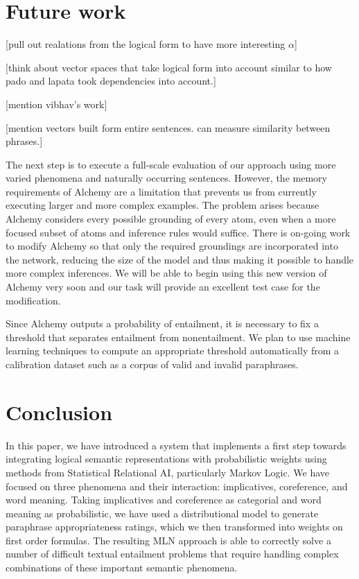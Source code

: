 \section{Future work}

[pull out realations from the logical form to have more interesting $\alpha$]

[think about vector spaces that take logical form into account similar to how
pado and lapata took dependencies into account.]

[mention vibhav's work]

[mention vectors built form entire sentences.  can measure similarity between
phrases.]



The next step is to execute a full-scale evaluation of our approach using 
more varied phenomena and naturally occurring sentences. 
However, the memory requirements of Alchemy are a limitation that prevents us
from currently executing larger and more complex examples.  The problem arises
because Alchemy considers every possible grounding of every atom, even when a
more focused subset of atoms and inference rules would suffice. There is on-going
work to modify Alchemy so that only the required groundings are incorporated
into the network, reducing the size of the model and thus making it possible to
handle more complex inferences.  We will be able to begin using this new version
of Alchemy very soon and our task will provide an excellent test case for the
modification.

Since Alchemy outputs a probability of entailment, it is necessary to fix a
threshold that separates entailment from nonentailment.
We plan to use machine learning techniques to compute an appropriate threshold
automatically from a calibration dataset such as a corpus of valid and invalid
paraphrases.


\section{Conclusion}

In this paper, we have introduced a system that implements a first step
towards integrating logical semantic representations with
probabilistic weights using methods from Statistical Relational AI,
particularly Markov Logic. We have focused on three phenomena and their
interaction: implicatives, coreference, and word meaning. Taking
implicatives and coreference as categorial and word meaning as
probabilistic, we have used a distributional model to generate
paraphrase appropriateness ratings, which we then transformed into
weights on first order formulas.
The resulting MLN approach is able to correctly solve a number of difficult
textual entailment problems that require handling complex combinations of these
important semantic phenomena.

